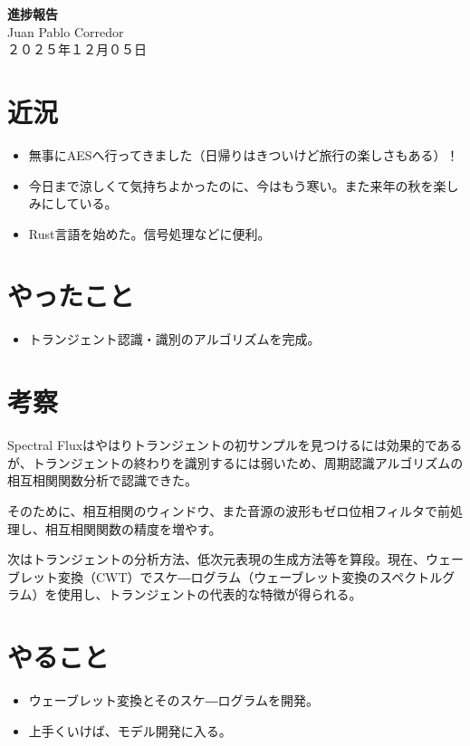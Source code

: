 \documentclass[a4paper, 11pt]{article}
\begin{document}
\begin{center}
    {\LARGE \bfseries 進捗報告} \\ %
    \vspace{0.3em} %
    Juan Pablo Corredor \\ %
    ２０２５年１２月０５日 %
\end{center}
\vspace{0.5em} %

\section*{近況}
\begin{itemize}
    \item 無事にAESへ行ってきました（日帰りはきついけど旅行の楽しさもある）！
    \item 今日まで涼しくて気持ちよかったのに、今はもう寒い。また来年の秋を楽しみにしている。
    \item Rust言語を始めた。信号処理などに便利。
\end{itemize} 

\section*{やったこと}
\begin{itemize} 
    \item トランジェント認識・識別のアルゴリズムを完成。
\end{itemize}

\section*{考察}

Spectral Fluxはやはりトランジェントの初サンプルを見つけるには効果的であるが、トランジェントの終わりを識別するには弱いため、周期認識アルゴリズムの相互相関関数分析で認識できた。

そのために、相互相関のウィンドウ、また音源の波形もゼロ位相フィルタで前処理し、相互相関関数の精度を増やす。

次はトランジェントの分析方法、低次元表現の生成方法等を算段。現在、ウェーブレット変換（CWT）でスケ―ログラム（ウェーブレット変換のスペクトルグラム）を使用し、トランジェントの代表的な特徴が得られる。

\section*{やること}
\begin{itemize}
    \item ウェーブレット変換とそのスケ―ログラムを開発。
    \item 上手くいけば、モデル開発に入る。
\end{itemize}
\end{document}
